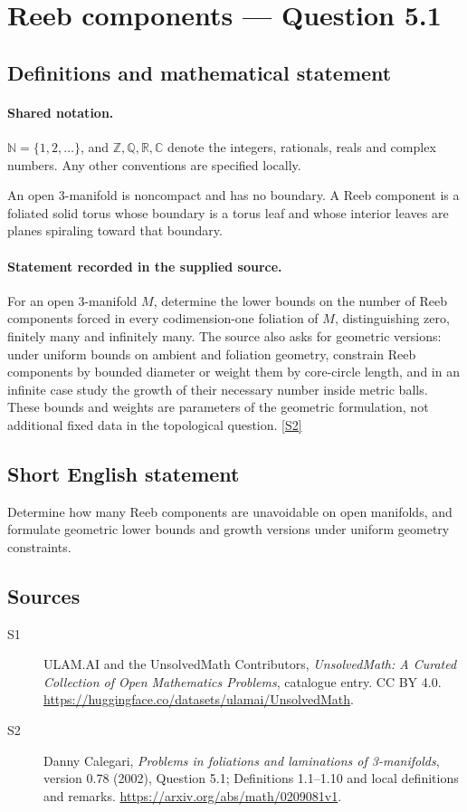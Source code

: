 \documentclass[11pt]{article}
\newcommand{\sref}[2]{\hyperlink{source:#1:#2}{[S#2]}}
\begin{document}
\section{Reeb components — Question 5.1}\label{statement}

\subsection{Definitions and mathematical statement}

\paragraph{Shared notation.}$\mathbb N=\{1,2,\ldots\}$, and $\mathbb Z,\mathbb Q,\mathbb R,\mathbb C$ denote the integers, rationals, reals and complex numbers. Any other conventions are specified locally.


An open $3$-manifold is noncompact and has no boundary. A Reeb component is a foliated solid torus whose boundary is a torus leaf and whose interior leaves are planes spiraling toward that boundary.
\paragraph{Statement recorded in the supplied source.}
For an open $3$-manifold $M$, determine the lower bounds on the number of Reeb components forced in every codimension-one foliation of $M$, distinguishing zero, finitely many and infinitely many. The source also asks for geometric versions: under uniform bounds on ambient and foliation geometry, constrain Reeb components by bounded diameter or weight them by core-circle length, and in an infinite case study the growth of their necessary number inside metric balls. These bounds and weights are parameters of the geometric formulation, not additional fixed data in the topological question. \sref{statement}{2}
\subsection{Short English statement}
Determine how many Reeb components are unavoidable on open manifolds, and formulate geometric lower bounds and growth versions under uniform geometry constraints.
\subsection{Sources}
\begin{description}
\item[\hypertarget{source:statement:1}{S1}] ULAM.AI and the UnsolvedMath Contributors, \emph{UnsolvedMath: A Curated Collection of Open Mathematics Problems}, catalogue entry. CC BY 4.0. \url{https://huggingface.co/datasets/ulamai/UnsolvedMath}.
\item[\hypertarget{source:statement:2}{S2}] Danny Calegari, \emph{Problems in foliations and laminations of 3-manifolds}, version 0.78 (2002), Question 5.1; Definitions 1.1--1.10 and local definitions and remarks. \url{https://arxiv.org/abs/math/0209081v1}.
\end{description}
\label{end:statement}
\end{document}

